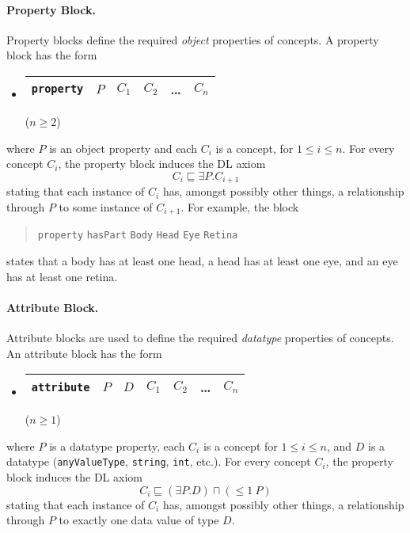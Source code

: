 \documentclass[11pt,onecolumn]{article}
\begin{document}
\paragraph{Property Block.} Property blocks define the required
\emph{object} properties of concepts. A property block has the form
\begin{itemize}
\item[]
  \begin{tabular}{|l|l|l|l|l|l|}\hline \texttt{property} & $P$ & $C_1$
& $C_2$ & \dots & $C_n$ \\ \hline
\end{tabular} \hfill ($n \ge 2$)
\end{itemize}
where $P$ is an object property and each $C_i$ is a concept, for $1
\le i \le n$.  For every concept $C_i$, the property block induces the
DL axiom \[C_i \sqsubseteq \exists P . C_{i+1} \] stating that each
instance of $C_i$ has, amongst possibly other things, a relationship
through $P$ to some instance of $C_{i+1}$.  For example, the block
\begin{quote}\texttt{property} \texttt{hasPart} \texttt{Body}
  \texttt{Head} \texttt{Eye} \texttt{Retina}
\end{quote} states that a body has at least one head, a head has at
least one eye, and an eye has at least one retina.

\paragraph{Attribute Block.} Attribute blocks are used to define the
required \emph{datatype} properties of concepts. An attribute block
has the form
\begin{itemize}
\item[]
  \begin{tabular}{|l|l|l|l|l|l|l|}\hline \texttt{attribute} & $P$ & $D$ & $C_1$
    & $C_2$ & \dots & $C_n$ \\ \hline
\end{tabular} \hfill ($n \ge 1$)
\end{itemize}
where $P$ is a datatype property, each $C_i$ is a concept for $1 \le i
\le n$, and $D$ is a datatype (\texttt{anyValueType}, \texttt{string},
\texttt{int}, etc.). For every concept $C_i$, the property block
induces the DL axiom \[C_i \sqsubseteq (\exists P . D) \sqcap (\le 1 ~
P)\] stating that each instance of $C_i$ has, amongst possibly other
things, a relationship through $P$ to exactly one data value of type
$D$. 
\end{document}
